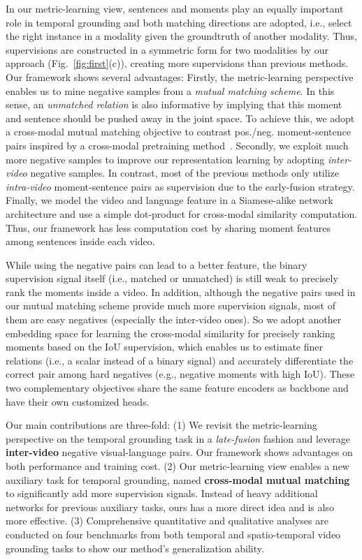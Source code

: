 \documentclass[letterpaper]{article} \usepackage{aaai22}  \usepackage{times}  \usepackage{helvet}  \usepackage{courier}  \usepackage[hyphens]{url}  \usepackage{graphicx} \urlstyle{rm} \def\UrlFont{\rm}  \usepackage{natbib}  \usepackage{caption} \DeclareCaptionStyle{ruled}{labelfont=normalfont,labelsep=colon,strut=off} \frenchspacing  \setlength{\pdfpagewidth}{8.5in}  \setlength{\pdfpageheight}{11in}  \usepackage{algorithm}
\begin{document}
In our metric-learning view, sentences and moments play an equally important role in temporal grounding and both matching directions are adopted, i.e., select the right instance in a modality given the groundtruth of another modality. Thus, supervisions are constructed in a symmetric form for two modalities by our approach (Fig.~\ref{fig:first}(c)), creating more supervisions than previous methods. Our framework shows several advantages: Firstly, the metric-learning perspective enables us to mine negative samples from a {\em mutual matching scheme}. In this sense, an {\em unmatched relation} is also informative by implying that this moment and sentence should be pushed away in the joint space. To achieve this, we adopt a cross-modal mutual matching objective to contrast pos./neg. moment-sentence pairs inspired by a cross-modal pretraining method~\cite{DBLP:journals/corr/abs-2001-05691}. 
Secondly, we exploit much more negative samples to improve our representation learning by adopting {\em inter-video} negative samples. In contrast, most of the previous methods only utilize {\em intra-video} moment-sentence pairs as supervision due to the early-fusion strategy.
Finally, we model the video and language feature in a Siamese-alike network architecture and use a simple dot-product for cross-modal similarity computation. Thus, our framework has less computation cost by sharing moment features among sentences inside each video.

While using the negative pairs can lead to a better feature, the binary supervision signal itself (i.e., matched or unmatched) is still weak to precisely rank the moments inside a video. In addition, although the negative pairs used in our mutual matching scheme provide much more supervision signals, most of them are easy negatives (especially the inter-video ones). So we adopt another embedding space for learning the cross-modal similarity for precisely ranking moments based on the IoU supervision, which enables us to estimate finer relations (i.e., a scalar instead of a binary signal) and accurately differentiate the correct pair among hard negatives (e.g., negative moments with high IoU). These two complementary objectives share the same feature encoders as backbone and have their own customized heads.

Our main contributions are three-fold: (1) We revisit the metric-learning perspective on the temporal grounding task in a {\em late-fusion} fashion and leverage {\bf inter-video} negative visual-language pairs. Our framework shows advantages on both performance and training cost. (2) Our metric-learning view enables a new auxiliary task for temporal grounding, named {\bf cross-modal mutual matching} to significantly add more supervision signals. Instead of heavy additional networks for previous auxiliary tasks, ours has a more direct idea and is also more effective. (3) Comprehensive quantitative and qualitative analyses are conducted on four benchmarks from both temporal and spatio-temporal video grounding tasks to show our method's generalization ability.
\end{document}
